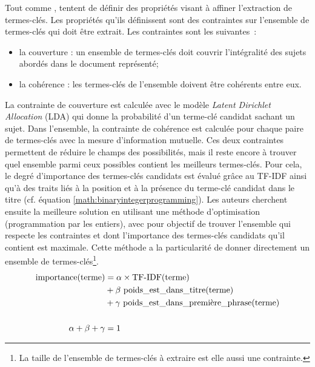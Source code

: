         Tout comme ,
         tentent de définir des
        propriétés visant à affiner l'extraction de termes-clés. Les
        propriétés qu'ils définissent sont des contraintes sur l'ensemble de
        termes-clés qui doit être extrait. Les contraintes sont les
        suivantes~:
        \begin{itemize}
          \item{la couverture : un ensemble de termes-clés doit couvrir
                l'intégralité des sujets abordés dans le document
                représenté;}
          \item{la cohérence : les termes-clés de l'ensemble doivent être
                cohérents entre eux.}
        \end{itemize}
        La contrainte de couverture est calculée avec le modèle \textit{Latent
        Dirichlet Allocation} (LDA) \cite{blei2003lda} qui donne la
        probabilité d'un terme-clé candidat sachant un sujet. Dans l'ensemble,
        la contrainte de cohérence est calculée pour chaque paire de
        termes-clés avec la mesure d'information mutuelle. Ces deux
        contraintes permettent de réduire le champs des possibilités, mais il
        reste encore à trouver quel ensemble parmi ceux possibles contient les
        meilleurs termes-clés. Pour cela, le degré d'importance des
        termes-clés candidats est évalué grâce au TF-IDF ainsi qu'à des traits
        liés à la position et à la présence du terme-clé candidat dans le
        titre (cf. équation \ref{math:binaryintegerprogramming}). Les auteurs
        cherchent ensuite la meilleure solution en utilisant une méthode
        d'optimisation (programmation par les entiers), avec pour objectif de
        trouver l'ensemble qui respecte les contraintes et dont l'importance
        des termes-clés candidats qu'il contient est maximale. Cette méthode a
        la particularité de donner directement un ensemble de
        termes-clés\footnote{La taille de l'ensemble de termes-clés à extraire
        est elle aussi une contrainte.}.
        \begin{align}
          \text{importance}(\text{terme}) &= \alpha \times \text{TF-IDF}(\text{terme}) \notag\\
                            &+ \beta\ \text{poids\_est\_dans\_titre}(\text{terme}) \notag\\
                            &+ \gamma\ \text{poids\_est\_dans\_première\_phrase}(\text{terme}) \label{math:binaryintegerprogramming}\\
          \notag\\
          \alpha + \beta + \gamma &= 1 \notag
        \end{align}


